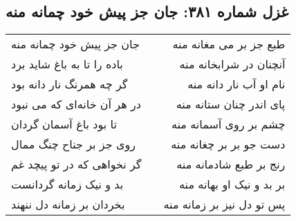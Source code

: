 \begin{center}
\section*{غزل شماره ۳۸۱: جان جز پیش خود چمانه منه}
\label{sec:381}
\begin{longtable}{l p{0.5cm} r}
جان جز پیش خود چمانه منه
&&
طبع جز بر می مغانه منه
\\
باده را تا به باغ شاید برد
&&
آنچنان در شرابخانه منه
\\
گر چه همرنگ نار دانه بود
&&
نام او آب نار دانه منه
\\
در هر آن خانه‌ای که می نبود
&&
پای اندر چنان ستانه منه
\\
تا بود باغ آسمان گردان
&&
چشم بر روی آسمانه منه
\\
روی جز بر جناح چنگ ممال
&&
دست جو بر بر چغانه منه
\\
گر نخواهی که در تو پیچد غم
&&
رنج بر طبع شادمانه منه
\\
بد و نیک زمانه گردانست
&&
بر بد و نیک او بهانه منه
\\
بخردان بر زمانه دل ننهند
&&
پس تو دل نیز بر زمانه منه
\\
\end{longtable}
\end{center}
